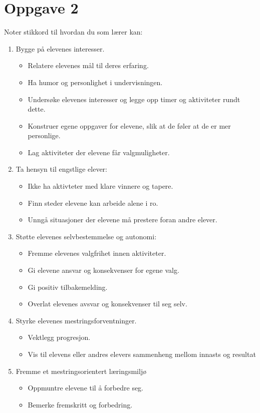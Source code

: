 \documentclass[11pt]{article}
\begin{document}
\section*{Oppgave 2}
\label{sec-2}
Noter stikkord til hvordan du som lærer kan:
\begin{enumerate}
\item Bygge på elevenes interesser.
\begin{itemize}
\item Relatere elevenes mål til deres erfaring.
\item Ha humor og personlighet i undervisningen.
\item Undersøke elevenes interesser og legge opp timer og aktiviteter rundt dette.
\item Konstruer egene oppgaver for elevene, slik at de føler at de er mer personlige.
\item Lag aktiviteter der elevene får valgmuligheter.
\end{itemize}
\item Ta hensyn til engstlige elever:
\begin{itemize}
\item Ikke ha aktivteter med klare vinnere og tapere.
\item Finn steder elevene kan arbeide alene i ro.
\item Unngå situasjoner der elevene må prestere foran andre elever.
\end{itemize}
\item Støtte elevenes selvbestemmelse og autonomi:
\begin{itemize}
\item Fremme elevenes valgfrihet innen aktiviteter.
\item Gi elevene ansvar og konsekvenser for egene valg.
\item Gi positiv tilbakemelding.
\item Overlat elevenes avsvar og konsekvenser til seg selv.
\end{itemize}
\item Styrke elevenes mestringsforventninger.
\begin{itemize}
\item Vektlegg progresjon.
\item Vis til elevens eller andres elevers sammenheng mellom innasts og resultat
\end{itemize}
\item Fremme et mestringsorientert læringsmiljø
\begin{itemize}
\item Oppmuntre elevene til å forbedre seg.
\item Bemerke fremskritt og forbedring.
\end{itemize}
\end{enumerate}
\end{document}
